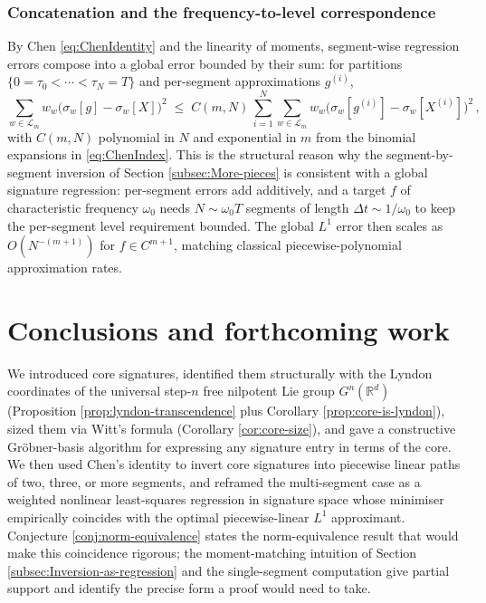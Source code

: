 \documentclass[12pt,english]{article}
\theoremstyle{remark}
\begin{document}
\subsubsection{Concatenation and the frequency-to-level correspondence}

By Chen \eqref{eq:ChenIdentity} and the linearity of moments, segment-wise
regression errors compose into a global error bounded by their sum:
for partitions $\{0=\tau_{0}<\cdots<\tau_{N}=T\}$ and per-segment
approximations $g^{(i)}$,
\begin{equation}
\sum_{w\in\mathcal{L}_{m}}w_{w}\bigl(\sigma_{w}[g]-\sigma_{w}[X]\bigr)^{2}\;\leq\;C(m,N)\,\sum_{i=1}^{N}\sum_{w\in\mathcal{L}_{m}}w_{w}\bigl(\sigma_{w}[g^{(i)}]-\sigma_{w}[X^{(i)}]\bigr)^{2}\,,\label{eq:concatenation-bound}
\end{equation}
with $C(m,N)$ polynomial in $N$ and exponential in $m$ from the
binomial expansions in \eqref{eq:ChenIndex}. This is the structural
reason why the segment-by-segment inversion of Section \ref{subsec:More-pieces}
is consistent with a global signature regression: per-segment errors
add additively, and a target $f$ of characteristic frequency $\omega_{0}$
needs $N\sim\omega_{0}T$ segments of length $\Delta t\sim1/\omega_{0}$
to keep the per-segment level requirement bounded. The global $L^{1}$
error then scales as $O(N^{-(m+1)})$ for $f\in C^{m+1}$, matching
classical piecewise-polynomial approximation rates.

\section{Conclusions and forthcoming work}

We introduced core signatures, identified them structurally with the
Lyndon coordinates of the universal step-$n$ free nilpotent Lie group
$G^{n}(\mathbb{R}^{d})$ (Proposition \ref{prop:lyndon-transcendence}
plus Corollary \ref{prop:core-is-lyndon}),
sized them via Witt's formula (Corollary \ref{cor:core-size}), and
gave a constructive Gröbner-basis algorithm for expressing any signature
entry in terms of the core. We then used Chen's identity to invert
core signatures into piecewise linear paths of two, three, or more
segments, and reframed the multi-segment case as a weighted nonlinear
least-squares regression in signature space whose minimiser empirically
coincides with the optimal piecewise-linear $L^{1}$ approximant.
Conjecture \ref{conj:norm-equivalence} states the norm-equivalence
result that would make this coincidence rigorous; the moment-matching
intuition of Section \ref{subsec:Inversion-as-regression} and the
single-segment computation give partial support and identify the precise
form a proof would need to take.
\end{document}

